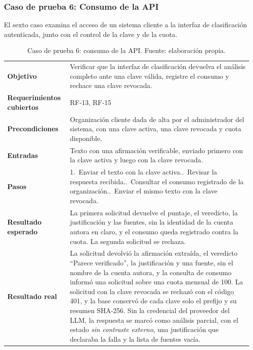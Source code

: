\subsubsection{Caso de prueba 6: Consumo de la API}

El sexto caso examina el acceso de un sistema cliente a la interfaz de clasificación autenticada, junto con el control de la clave y de la cuota.

\begin{small}
\begin{longtable}{@{}>{\raggedright\arraybackslash}p{3.4cm} p{11.8cm}@{}}
  \caption{Caso de prueba 6: consumo de la API. Fuente: elaboración propia.}
  \label{tab:cp-06} \\
    \hline
    \textbf{Objetivo} & Verificar que la interfaz de clasificación devuelva el análisis completo ante una clave válida, registre el consumo y rechace una clave revocada. \\
    \textbf{Requerimientos cubiertos} & RF-13, RF-15 \\
    \textbf{Precondiciones} & Organización cliente dada de alta por el administrador del sistema, con una clave activa, una clave revocada y cuota disponible. \\
    \textbf{Entradas} & Texto con una afirmación verificable, enviado primero con la clave activa y luego con la clave revocada. \\
    \textbf{Pasos} & 1.~Enviar el texto con la clave activa.\newline 2.~Revisar la respuesta recibida.\newline 3.~Consultar el consumo registrado de la organización.\newline 4.~Enviar el mismo texto con la clave revocada. \\
    \textbf{Resultado esperado} & La primera solicitud devuelve el puntaje, el veredicto, la justificación y las fuentes, sin la identidad de la cuenta autora en claro, y el consumo queda registrado contra la cuota. La segunda solicitud se rechaza. \\
    \textbf{Resultado real} & La solicitud devolvió la afirmación extraída, el veredicto \enquote{Parece verificado}, la justificación y una fuente, sin el nombre de la cuenta autora, y la consulta de consumo informó una solicitud sobre una cuota mensual de 100. La solicitud con la clave revocada se rechazó con el código 401, y la base conservó de cada clave solo el prefijo y su resumen SHA-256. Sin la credencial del proveedor del LLM, la respuesta se marcó como análisis parcial, con el estado \emph{sin contraste externo}, una justificación que declaraba la falla y la lista de fuentes vacía. \\

\end{longtable}
\end{small}
